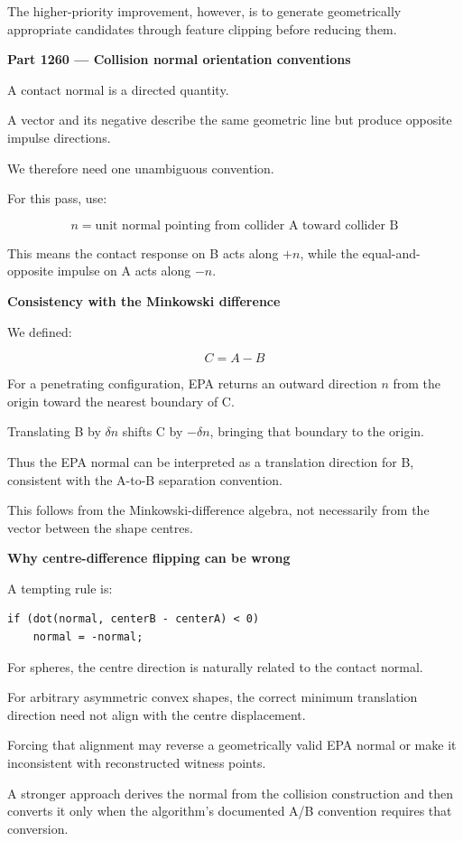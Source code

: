 The higher-priority improvement, however, is to generate geometrically appropriate candidates through feature clipping before reducing them.

\textbf{Part 1260 --- Collision normal orientation conventions}

A contact normal is a directed quantity.

A vector and its negative describe the same geometric line but produce opposite impulse directions.

We therefore need one unambiguous convention.

For this pass, use:

\[
\boxed{ n=\text{unit normal pointing from collider A toward collider B} }
\]

This means the contact response on B acts along \(+n\), while the equal-and-opposite impulse on A acts along \(-n\).

\textbf{Consistency with the Minkowski difference}

We defined:

\[
C=A-B
\]

For a penetrating configuration, EPA returns an outward direction \(n\) from the origin toward the nearest boundary of C.

Translating B by \(\delta n\) shifts C by \(-\delta n\), bringing that boundary to the origin.

Thus the EPA normal can be interpreted as a translation direction for B, consistent with the A-to-B separation convention.

This follows from the Minkowski-difference algebra, not necessarily from the vector between the shape centres.

\textbf{Why centre-difference flipping can be wrong}

A tempting rule is:

\begin{verbatim}
if (dot(normal, centerB - centerA) < 0)
    normal = -normal;
\end{verbatim}

For spheres, the centre direction is naturally related to the contact normal.

For arbitrary asymmetric convex shapes, the correct minimum translation direction need not align with the centre displacement.

Forcing that alignment may reverse a geometrically valid EPA normal or make it inconsistent with reconstructed witness points.

A stronger approach derives the normal from the collision construction and then converts it only when the algorithm's documented A/B convention requires that conversion.

